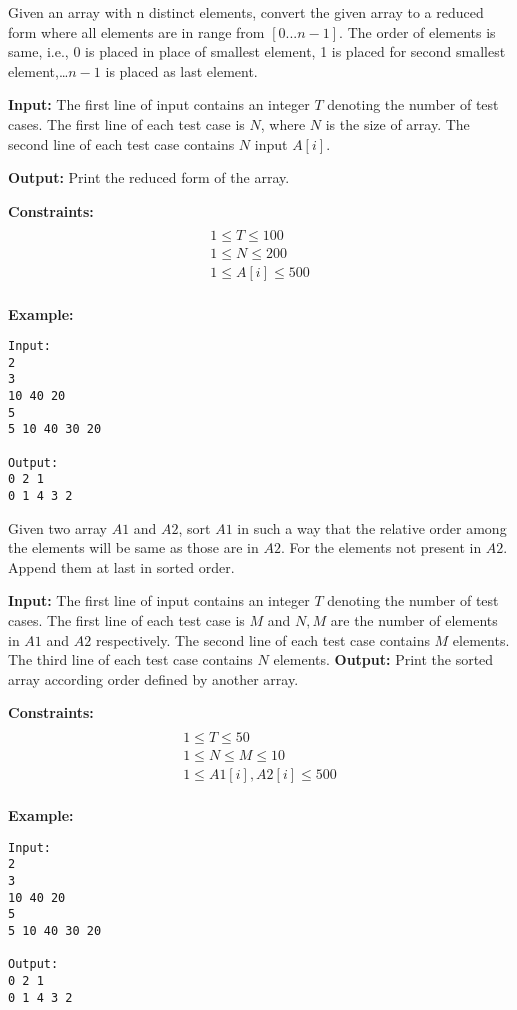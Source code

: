 \begin{problem}
Given an array with n distinct elements, convert the given array to a reduced form where all elements are in range from $[0 ... n-1]$. The order of elements is same, i.e., 0 is placed in place of smallest element, 1 is placed for second smallest element,\ldots $n-1$ is placed as last element.

\textbf{Input:}
The first line of input contains an integer $T$ denoting the number of test cases.
The first line of each test case is $N$, where $N$ is the size of array.
The second line of each test case contains $N$ input $A[i]$.

\textbf{Output:}
Print the reduced form of the array.

\textbf{Constraints:}
\begin{multline}\\
1 \leq T \leq 100\\
1 \leq N \leq 200\\
1 \leq A[i] \leq 500\\
\end{multline}

\textbf{Example:}
\begin{verbatim}
Input:
2
3
10 40 20
5
5 10 40 30 20

Output:
0 2 1
0 1 4 3 2

\end{verbatim}

\end{problem}


\begin{problem}
Given two array $A1$ and $A2$, sort $A1$ in such a way that the relative order among the elements will be same as those are in $A2$. For the elements not present in $A2$. Append them at last in sorted order.

\textbf{Input:}
The first line of input contains an integer $T$ denoting the number of test cases.
The first line of each test case is $M$ and $N,M$ are the number of elements in $A1$ and $A2$ respectively.
The second line of each test case contains $M$ elements.
The third line of each test case contains $N$ elements.
\textbf{Output:}
Print the sorted array according order defined by another array.

\textbf{Constraints:}
\begin{multline}\\
1 \leq T \leq 50\\
1 \leq N \leq M \leq 10\\
1 \leq A1[i],A2[i] \leq 500\\
\end{multline}

\textbf{Example:}
\begin{verbatim}
Input:
2
3
10 40 20
5
5 10 40 30 20

Output:
0 2 1
0 1 4 3 2

\end{verbatim}

\end{problem}


